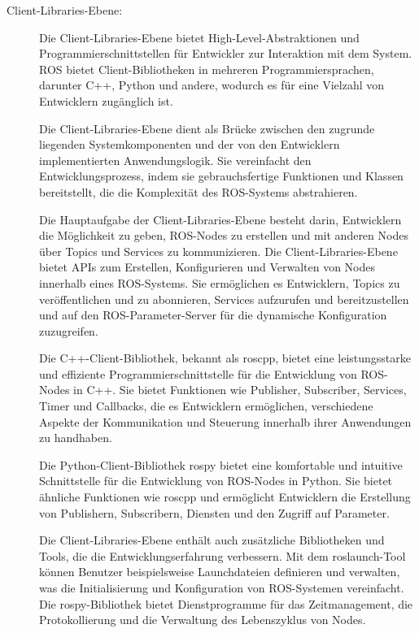 \begin{description}
    \cite[vgl.][]{computationGraph}
    
    \item[Client-Libraries-Ebene:] Die Client-Libraries-Ebene bietet High-Level-Abstraktionen und Programmierschnittstellen für Entwickler zur Interaktion mit dem System. \ac{ROS} bietet Client-Bibliotheken in mehreren Programmiersprachen, darunter C++, Python und andere, wodurch es für eine Vielzahl von Entwicklern zugänglich ist.

    Die Client-Libraries-Ebene dient als Brücke zwischen den zugrunde liegenden Systemkomponenten und der von den Entwicklern implementierten Anwendungslogik. Sie vereinfacht den Entwicklungsprozess, indem sie gebrauchsfertige Funktionen und Klassen bereitstellt, die die Komplexität des \ac{ROS}-Systems abstrahieren.
    
    Die Hauptaufgabe der Client-Libraries-Ebene besteht darin, Entwicklern die Möglichkeit zu geben, ROS-Nodes zu erstellen und mit anderen Nodes über Topics und Services zu kommunizieren. Die Client-Libraries-Ebene bietet APIs zum Erstellen, Konfigurieren und Verwalten von Nodes innerhalb eines \ac{ROS}-Systems. Sie ermöglichen es Entwicklern, Topics zu veröffentlichen und zu abonnieren, Services aufzurufen und bereitzustellen und auf den ROS-Parameter-Server für die dynamische Konfiguration zuzugreifen.
    
    Die C++-Client-Bibliothek, bekannt als roscpp, bietet eine leistungsstarke und effiziente Programmierschnittstelle für die Entwicklung von ROS-Nodes in C++. Sie bietet Funktionen wie Publisher, Subscriber, Services, Timer und Callbacks, die es Entwicklern ermöglichen, verschiedene Aspekte der Kommunikation und Steuerung innerhalb ihrer Anwendungen zu handhaben. \cite[vgl.][]{roscpp}
    
    Die Python-Client-Bibliothek rospy bietet eine komfortable und intuitive Schnittstelle für die Entwicklung von ROS-Nodes in Python. Sie bietet ähnliche Funktionen wie roscpp und ermöglicht Entwicklern die Erstellung von Publishern, Subscribern, Diensten und den Zugriff auf Parameter. \cite[vgl.][]{rospy}
    
    Die Client-Libraries-Ebene enthält auch zusätzliche Bibliotheken und Tools, die die Entwicklungserfahrung verbessern. Mit dem roslaunch-Tool können Benutzer beispielsweise Launchdateien definieren und verwalten, was die Initialisierung und Konfiguration von \ac{ROS}-Systemen vereinfacht. Die rospy-Bibliothek bietet Dienstprogramme für das Zeitmanagement, die Protokollierung und die Verwaltung des Lebenszyklus von Nodes. \cite[vgl.][]{roslaunch}
    

\end{description}
